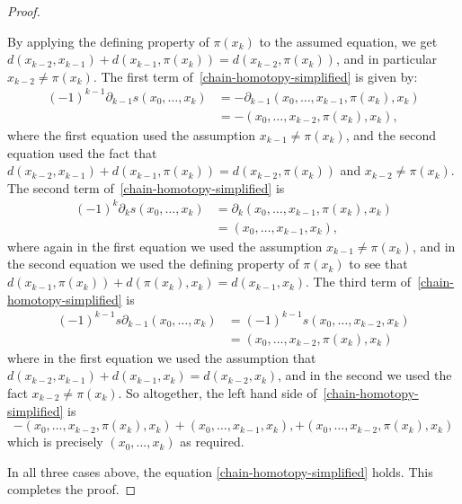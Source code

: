 \documentclass[10pt,a4paper]{amsart}
\begin{document}
\begin{proof}
\begin{itemize}
        By applying the defining property of $\pi(x_k)$ to
        the assumed equation, we get
        $d(x_{k-2},x_{k-1})+d(x_{k-1},\pi(x_k)) 
        = d(x_{k-2},\pi(x_k))$,
        and in particular $x_{k-2}\neq \pi(x_k)$.
        The first term of~\eqref{chain-homotopy-simplified}
        is given by:
        \begin{align*}
    	(-1)^{k-1}\partial_{k-1}s(x_0,\ldots,x_k)
            &=
    	-\partial_{k-1}(x_0,\ldots,x_{k-1},\pi(x_k),x_k)
            \\
            &=
            -(x_0,\ldots,x_{k-2},\pi(x_k),x_k),
        \end{align*}
        where the first equation used the assumption
        $x_{k-1}\neq\pi(x_k)$, 
        and the second equation used the fact that
        $d(x_{k-2},x_{k-1})+d(x_{k-1},\pi(x_k))
        = d(x_{k-2},\pi(x_k))$ and $x_{k-2}\neq\pi(x_k)$.
        The second term of~\eqref{chain-homotopy-simplified} is 
        \begin{align*}
    	(-1)^k \partial_k s(x_0,\ldots,x_k)
            &=
            \partial_k (x_0,\ldots,x_{k-1},\pi(x_k),x_k)
            \\
            &=
    	(x_0,\ldots,x_{k-1},x_k),
        \end{align*}
        where again in the first equation we used the assumption
        $x_{k-1}\neq\pi(x_k)$, and in the second equation
        we used the defining property of 
        $\pi(x_k)$ to see that
        $d(x_{k-1},\pi(x_k))+d(\pi(x_k),x_k) = d(x_{k-1},x_k)$.
        The third term of~\eqref{chain-homotopy-simplified} is  
        \begin{align*}
    	(-1)^{k-1}s\partial_{k-1}(x_0,\ldots,x_k)
            &=
    	(-1)^{k-1}s(x_0,\ldots,x_{k-2},x_k)
            \\
            &=
    	(x_0,\ldots,x_{k-2},\pi(x_k),x_k)
        \end{align*} 
        where in the first equation we used the assumption
        that
        $d(x_{k-2},x_{k-1})+d(x_{k-1},x_k) = d(x_{k-2},x_k)$,
        and in the second we used the fact $x_{k-2}\neq\pi(x_k)$.
        So altogether, the left hand side 
        of~\eqref{chain-homotopy-simplified} is
        \[
            -(x_0,\ldots,x_{k-2},\pi(x_k),x_k)
            +
    	(x_0,\ldots,x_{k-1},x_k),
            +
    	(x_0,\ldots,x_{k-2},\pi(x_k),x_k)
        \]
        which is precisely $(x_0,\ldots,x_k)$ as required.
    \end{itemize}
    In all three cases above, the equation
    \eqref{chain-homotopy-simplified} holds.
    This completes the proof.
\end{proof}
\end{document}
